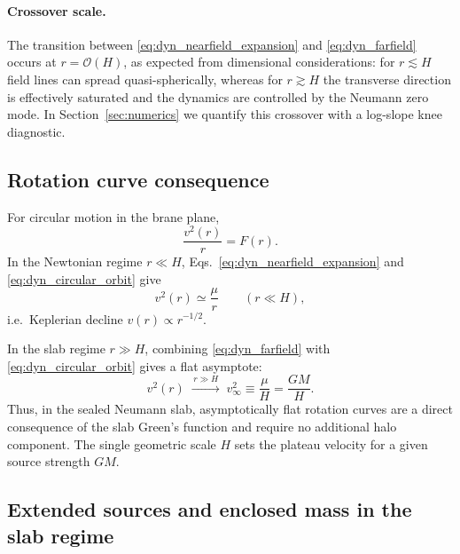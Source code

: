 \documentclass[11pt]{article}
\begin{document}
\paragraph{Crossover scale.}
The transition between \eqref{eq:dyn_nearfield_expansion} and \eqref{eq:dyn_farfield} occurs at
$r=\mathcal{O}(H)$, as expected from dimensional considerations: for $r\lesssim H$ field lines can
spread quasi-spherically, whereas for $r\gtrsim H$ the transverse direction is effectively saturated
and the dynamics are controlled by the Neumann zero mode.  In Section~\ref{sec:numerics} we quantify
this crossover with a log-slope knee diagnostic.

\subsection{Rotation curve consequence}
\label{sec:rotation_curves}

For circular motion in the brane plane,
\begin{equation}
  \frac{v^2(r)}{r} = F(r).
  \label{eq:dyn_circular_orbit}
\end{equation}
In the Newtonian regime $r\ll H$, Eqs.~\eqref{eq:dyn_nearfield_expansion} and
\eqref{eq:dyn_circular_orbit} give
\begin{equation}
  v^2(r) \simeq \frac{\mu}{r}
  \qquad (r\ll H),
\end{equation}
i.e.\ Keplerian decline $v(r)\propto r^{-1/2}$.

In the slab regime $r\gg H$, combining \eqref{eq:dyn_farfield} with \eqref{eq:dyn_circular_orbit}
gives a flat asymptote:
\begin{equation}
  v^2(r) \;\xrightarrow{\,r\gg H\,}\; v_\infty^2
  \equiv \frac{\mu}{H} = \frac{GM}{H}.
  \label{eq:dyn_vinf}
\end{equation}
Thus, in the sealed Neumann slab, asymptotically flat rotation curves are a direct consequence of
the slab Green's function and require no additional halo component.  The single geometric scale $H$
sets the plateau velocity for a given source strength $GM$.

\subsection{Extended sources and enclosed mass in the slab regime}
\label{sec:extended_sources}
\end{document}
